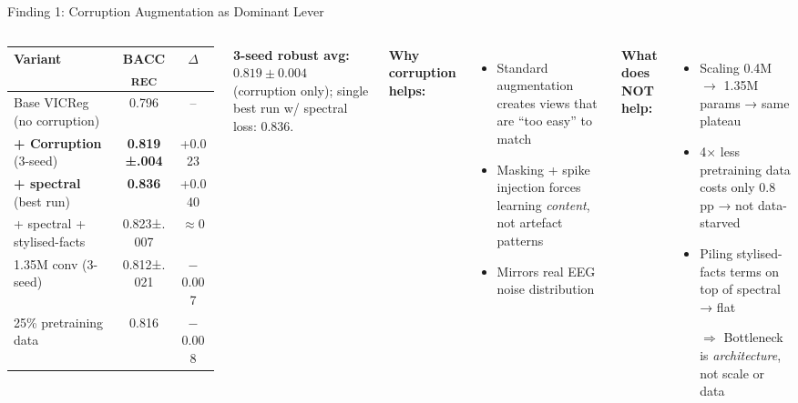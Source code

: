 \documentclass[aspectratio=169,10pt]{beamer}
\begin{document}
\begin{frame}{Finding 1: Corruption Augmentation as Dominant Lever}
\begin{columns}[T]
{\scriptsize
\begin{tabular}{p{3.5cm}cc}
\toprule
Variant & BACC\textsubscript{REC} & $\Delta$ \\
\midrule
Base VICReg (no corruption) & 0.796 & -- \\
\textbf{+ Corruption} (3-seed) & \textbf{0.819±.004} & \textcolor{good}{+0.023} \\
\textbf{+ spectral} (best run) & \textbf{0.836} & \textcolor{good}{+0.040} \\
+ spectral + stylised-facts & 0.823±.007 & $\approx$0 \\
1.35M conv (3-seed) & 0.812±.021 & $-$0.007 \\
25\% pretraining data & 0.816 & $-$0.008 \\
\bottomrule
\end{tabular}
}

\vspace{0.5em}
\textbf{3-seed robust avg:} $0.819 \pm 0.004$ (corruption only); single best run w/ spectral loss: 0.836.

\textbf{Why corruption helps:}
\begin{itemize}
  \item Standard augmentation creates views that are ``too easy'' to match
  \item Masking + spike injection forces learning \emph{content}, not artefact patterns
  \item Mirrors real EEG noise distribution
\end{itemize}

\vspace{0.5em}
\textbf{What does NOT help:}
\begin{itemize}
  \item Scaling 0.4M $\to$ 1.35M params → same plateau
  \item 4$\times$ less pretraining data costs only 0.8\,pp → not data-starved
  \item Piling stylised-facts terms on top of spectral → flat
  \item[$\Rightarrow$] Bottleneck is \emph{architecture}, not scale or data
\end{itemize}
\end{columns}
\end{frame}
\end{document}
